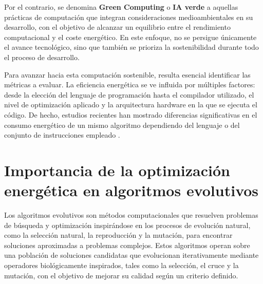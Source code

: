 Por el contrario, se denomina \textbf{Green Computing} o \textbf{IA verde} a aquellas prácticas de computación que integran consideraciones medioambientales en su desarrollo, con el objetivo de alcanzar un equilibrio entre el rendimiento computacional y el coste energético. En este enfoque, no se persigue únicamente el avance tecnológico, sino que también se prioriza la sostenibilidad durante todo el proceso de desarrollo. \cite{zhou2023opportunities}

Para avanzar hacia esta computación sostenible, resulta esencial identificar las métricas a evaluar. La eficiencia energética se ve influida por múltiples factores: desde la elección del lenguaje de programación hasta el compilador utilizado, el nivel de optimización aplicado y la arquitectura hardware en la que se ejecuta el código. De hecho, estudios recientes han mostrado diferencias significativas en el consumo energético de un mismo algoritmo dependiendo del lenguaje o del conjunto de instrucciones empleado \cite{lutz2021energy}.

\section{Importancia de la optimización energética en algoritmos evolutivos}

Los algoritmos evolutivos son métodos computacionales que resuelven problemas de búsqueda y optimización inspirándose en los procesos de evolución natural, como la selección natural, la reproducción y la mutación, para encontrar soluciones aproximadas a problemas complejos. Estos algoritmos operan sobre una población de soluciones candidatas que evolucionan iterativamente mediante operadores biológicamente inspirados, tales como la selección, el cruce y la mutación, con el objetivo de mejorar su calidad según un criterio definido.



